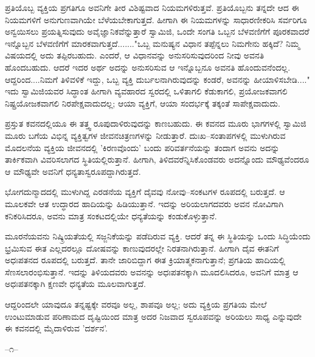 ಪ್ರತಿಯೊಬ್ಬ ವ್ಯಕ್ತಿಯ ಪ್ರಗತಿಗೂ ಅವನಿಗೇ ತೀರ ವಿಶಿಷ್ಟವಾದ ನಿಯಮಗಳಿರುತ್ತವೆ. ಪ್ರತಿಯೊಬ್ಬನು ತನ್ನದೇ ಆದ ಈ ನಿಯಮಗಳಿಗೆ ಅನುಗುಣವಾಗಿಯೇ ಬೆಳೆಯಬೇಕಾಗುತ್ತದೆ. ಹೀಗಾಗಿ ಈ ನಿಯಮಗಳನ್ನು ಸಾಧಾರಣೀಕರಿಸಿ ಸರ್ವರಿಗೂ ಅನ್ವಯಿಸಲು ಪ್ರಯತ್ನಿಸುವುದು ಅವೈಜ್ಞಾನಿಕವೆನ್ನುತ್ತಾರೆ ಸ್ವಾಮಿಜಿ, ಒಂದೇ ಸಂಗತಿ ಒಬ್ಬನ ಬೆಳವಣಿಗೆಗೆ ಪೂರಕವಾದರೆ ಇನ್ನೊಬ್ಬನ ಬೆಳವಣಿಗೆಗೆ ಮಾರಕವಾಗುತ್ತದೆ......."ಒಬ್ಬ ಮನುಷ್ಯನ ವಿಧಾನ ತಪ್ಪೆನ್ನಲು ನಿಮಗೇನು ಹಕ್ಕಿದೆ? ನಿಮ್ಮ ವಿಷಯದಲ್ಲಿ ಅದು ತಪ್ಪಿರಬಹುದು. ಎಂದರೆ, ಆ ವಿಧಾನವನ್ನು ಅನುಸರಿಸುವುದರಿಂದ ನೀವು ಅವನತಿ ಹೊಂದಬಹುದು. ಆದರೆ ಇದರ ಅರ್ಥ ಅದನ್ನು ಅನುಸರಿಸುವ ಆ ಇನ್ನೊಬ್ಬನೂ ಅವನತಿ ಹೊಂದುವನೆಂದಲ್ಲ. ಆದ್ದರಿಂದ....ನಿಮಗೆ ತಿಳಿವಳಿಕೆ ಇದ್ದು, ಒಬ್ಬ ವ್ಯಕ್ತಿ ದುರ್ಬಲನಾಗಿರುವುದನ್ನು ಕಂಡರೆ, ಅವನನ್ನು ಹೀಯಾಳಿಸಬೇಡಿ...." ಇದು ಸ್ವಾಮಿಜಿಯವರ ಸಿದ್ಧಾಂತ  ಹೀಗಾಗಿ ವ್ಯವಹಾರದ ಸ್ವರದಲ್ಲಿ ಒಳಿತಾಗಲಿ ಕೆಡುಕಾಗಲಿ, ಪ್ರಯೋಜಕವಾಗಲಿ ನಿಷ್ಪ್ರಯೋಜಕವಾಗಲಿ ನಿರಪೇಕ್ಷವಾದುದಲ್ಲ; ಆಯಾ ವ್ಯಕ್ತಿಗೆ, ಆಯಾ ಸಂದರ್ಭಕ್ಕೆ ತಕ್ಕಂತೆ ಸಾಪೇಕ್ಷವಾದುದು.

ಪ್ರಸ್ತುತ ಕವನದಲ್ಲಿಯೂ ಈ ತತ್ತ್ವ ರೂಪುದಾಳಿರುವುದನ್ನು ಕಾಣಬಹುದು. ಈ ಕವನದ ಮೂರು ಭಾಗಗಳಲ್ಲಿ ಸ್ವಾಮಿಜಿ ಮೂರು ಬಗೆಯ ವಿಭಿನ್ನ ವ್ಯಕ್ತಿತ್ವಗಳ ಜೀವನಚಿತ್ರಣಗಳನ್ನು ನೀಡುತ್ತಾರೆ. ದುಃಖ–ಸಂತಾಪಗಳಲ್ಲಿ ಮುಳುಗಿರುವ ಮೊದಲನೆಯ ವ್ಯಕ್ತಿಯ ಜೀವನದಲ್ಲಿ 'ಕಿರಣವೊಂದು' ಬಂದು ಪರಿವರ್ತನೆಯನ್ನು ತಂದಾಗ ಅವನು ಅದನ್ನು ತಾರ್ಕಿಕವಾಗಿ ವಿವರಿಸಲಾಗದ ಸ್ಥಿತಿಯಲ್ಲಿರುತ್ತಾನೆ. ಹೀಗಾಗಿ, ತಿಳಿದವರೆನ್ನಿಸಿಕೊಂಡವರು ಅದನ್ನೊಂದು ಮೌಢ್ಯವೆಂದರೂ ಆ ಮೌಢ್ಯವೇ ಅವನಿಗೆ ಧನ್ಯತಾಸ್ವರೂಪದ್ದಾಗಿರುತ್ತದೆ.

ಭೋಗದುನ್ಮಾದದಲ್ಲಿ ಮುಳುಗಿದ್ದ ಎರಡನೆಯ ವ್ಯಕ್ತಿಗೆ ದೈವವು ನೋವು–ಸಂಕಟಗಳ ರೂಪದಲ್ಲಿ ಬರುತ್ತದೆ. ಆ ಮೂಲಕವೇ ಆತ ಉದ್ಧಾರದ ಹಾದಿಯನ್ನು ಹಿಡಿಯುತ್ತಾನೆ. ಇದನ್ನು ಅರಿಯಲಾಗದವರು ಅವನ ನೋವಿಗಾಗಿ ಕನಿಕರಿಸಿದರೂ, ಅವನು ಮಾತ್ರ ಸಂಕಟದಲ್ಲಿಯೇ ಧನ್ಯತೆಯನ್ನು ಕಂಡುಕೊಳ್ಳುತ್ತಾನೆ.

ಮೂರನೆಯವನು ನಿಷ್ಕ್ರಿಯತೆಯಲ್ಲಿ ಸಜ್ಜನಿಕೆಯನ್ನು ಪಡೆದಿರುವ ವ್ಯಕ್ತಿ. ಆದರೆ ತನ್ನ ಈ ಸ್ಥಿತಿಯನ್ನು ಒಂದು ಸಿದ್ಧಿಯೆಂದು ಭ್ರಮಿಸುವ ಈತ ಎಲ್ಲದರಲ್ಲೂ ದೋಷವನ್ನು ಕಾಣುವುದರಲ್ಲೇ ನಿರತನಾಗಿರುತ್ತಾನೆ. ಹೀಗಾಗಿ ದೈವ ಈತನಿಗೆ ಅಧಃಪತನದ ರೂಪದಲ್ಲಿ ಬರುತ್ತದೆ. ತಾನೇ ಜಾರಿಬಿದ್ದಾಗ ಈತ ಕ್ರಿಯಾತ್ಮಕನಾಗುತ್ತಾನೆ; ಪ್ರಗತಿಯ ಹಾದಿಯಲ್ಲಿ ಸೆಣಸಲಾರಂಭಿಸುತ್ತಾನೆ. ಇದನ್ನು ತಿಳಿಯದವರು ಅವನನ್ನು ಅಧಃಪತನಕ್ಕಾಗಿ ಮೂದಲಿಸಿದರೂ, ಅವನಿಗೆ ಮಾತ್ರ ಆ ಅಧಃಪತನಕ್ಕಾಗಿ ಕ್ಷಣವೇ ಧನ್ಯತೆಯ ಮೂಲವಾಗುತ್ತದೆ.

ಆದ್ದರಿಂದಲೇ ಯಾವುದೂ ತನ್ನಷ್ಟಕ್ಕೇ ವರವೂ ಅಲ್ಲ, ಶಾಪವೂ ಅಲ್ಲ; ಅದು ವ್ಯಕ್ತಿಯ ಪ್ರಗತಿಯ ಮೇಲೆ ಉಂಟುಮಾಡುವ ಪರಿಣಾಮದ ದೃಷ್ಟಿಯಿಂದ ಮಾತ್ರ ಅದರ ನಿಜವಾದ ಸ್ವರೂಪವನ್ನು ಅರಿಯಲು ಸಾಧ್ಯ ಎನ್ನುವುದೇ ಈ ಕವನದಲ್ಲಿ ಮೈದಾಳಿರುವ 'ದರ್ಶನ'.

\begin{center}
–೧–
\end{center}

